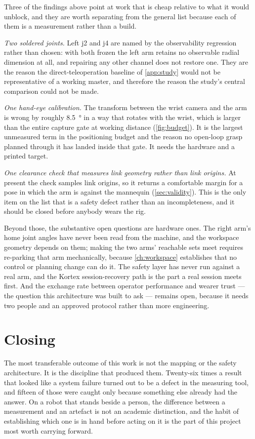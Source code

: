 Three of the findings above point at work that is cheap relative to what it
would unblock, and they are worth separating from the general list because
each of them is a measurement rather than a build.

\emph{Two soldered joints.} Left j2 and j4 are named by the observability
regression rather than chosen: with both frozen the left arm retains no
observable radial dimension at all, and repairing any other channel does not
restore one. They are the reason the direct-teleoperation baseline of
\cref{app:study} would not be representative of a working master, and
therefore the reason the study's central comparison could not be made.

\emph{One hand-eye calibration.} The transform between the wrist camera and
the arm is wrong by roughly \SI{8.5}{\degree} in a way that rotates with the
wrist, which is larger than the entire capture gate at working distance
(\cref{fig:budget}). It is the largest unmeasured term in the positioning
budget and the reason no open-loop grasp planned through it has landed inside
that gate. It needs the hardware and a printed target.

\emph{One clearance check that measures link geometry rather than link
origins.} At present the check samples link origins, so it returns a
comfortable margin for a pose in which the arm is against the mannequin
(\cref{sec:validity}). This is the only item on the list that is a safety
defect rather than an incompleteness, and it should be closed before anybody
wears the rig.

Beyond those, the substantive open questions are hardware ones. The right
arm's home joint angles have never been read from the machine, and the
workspace geometry depends on them; making the two arms' reachable sets meet
requires re-parking that arm mechanically, because \cref{ch:workspace}
establishes that no control or planning change can do it. The safety layer
has never run against a real arm, and the Kortex session-recovery path is the
part a real session meets first. And the exchange rate between operator
performance and wearer trust --- the question this architecture was built to
ask --- remains open, because it needs two people and an approved protocol
rather than more engineering.

\section{Closing}

The most transferable outcome of this work is not the mapping or the safety
architecture. It is the discipline that produced them. Twenty-six times a
result that looked like a system failure turned out to be a defect in the
measuring tool, and fifteen of those were caught only because something else
already had the answer. On a robot that stands beside a person, the
difference between a measurement and an artefact is not an academic
distinction, and the habit of establishing which one is in hand before acting
on it is the part of this project most worth carrying forward.
